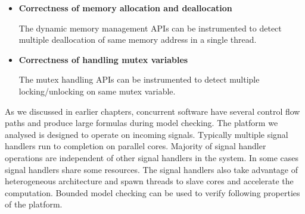 \begin{itemize}

\item \textbf{Correctness of memory allocation and deallocation}

The dynamic memory management APIs can be instrumented to detect multiple deallocation of same memory address in a single thread.

\item \textbf{Correctness of handling mutex variables}

The mutex handling APIs can be instrumented to detect multiple locking/unlocking on same mutex variable.

\end{itemize}


As we discussed in earlier chapters, concurrent software have several control flow paths and produce large formulas during model checking. The platform we analysed is designed to operate on incoming signals. Typically multiple signal handlers run to completion on parallel cores. Majority of signal handler operations are independent of other signal handlers in the system. In some cases signal handlers share some resources. The signal handlers also take advantage of heterogeneous architecture and spawn threads to slave cores and accelerate the computation. Bounded model checking can be used to verify following properties of the platform.

